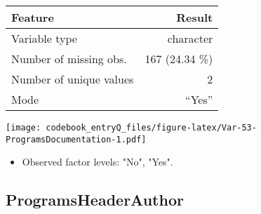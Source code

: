 \documentclass[]{article}
\providecommand{\tightlist}{%
  \setlength{\itemsep}{0pt}\setlength{\parskip}{0pt}}
\newcommand{\fullline}{\noindent\makebox[\linewidth]{\rule{\textwidth}{0.4pt}}}
\newcommand{\bminione}{\begin{minipage}{0.75 \textwidth}}
\newcommand{\bminitwo}{\begin{minipage}{0.25 \textwidth}}
\newcommand{\emini}{\end{minipage}}
\begin{document}
\bminione

\begin{longtable}[]{@{}lr@{}}
\toprule
\begin{minipage}[b]{0.34\columnwidth}\raggedright\strut
Feature\strut
\end{minipage} & \begin{minipage}[b]{0.20\columnwidth}\raggedleft\strut
Result\strut
\end{minipage}\tabularnewline
\midrule
\endhead
\begin{minipage}[t]{0.34\columnwidth}\raggedright\strut
Variable type\strut
\end{minipage} & \begin{minipage}[t]{0.20\columnwidth}\raggedleft\strut
character\strut
\end{minipage}\tabularnewline
\begin{minipage}[t]{0.34\columnwidth}\raggedright\strut
Number of missing obs.\strut
\end{minipage} & \begin{minipage}[t]{0.20\columnwidth}\raggedleft\strut
167 (24.34 \%)\strut
\end{minipage}\tabularnewline
\begin{minipage}[t]{0.34\columnwidth}\raggedright\strut
Number of unique values\strut
\end{minipage} & \begin{minipage}[t]{0.20\columnwidth}\raggedleft\strut
2\strut
\end{minipage}\tabularnewline
\begin{minipage}[t]{0.34\columnwidth}\raggedright\strut
Mode\strut
\end{minipage} & \begin{minipage}[t]{0.20\columnwidth}\raggedleft\strut
``Yes''\strut
\end{minipage}\tabularnewline
\bottomrule
\end{longtable}

\emini
\bminitwo
\texttt{[image: codebook\_entryQ\_files/figure-latex/Var-53-ProgramsDocumentation-1.pdf]}
\emini

\begin{itemize}
\tightlist
\item
  Observed factor levels: "No", "Yes".
\end{itemize}

\fullline

\hypertarget{programsheaderauthor}{\subsection{ProgramsHeaderAuthor}\label{programsheaderauthor}}
\end{document}
